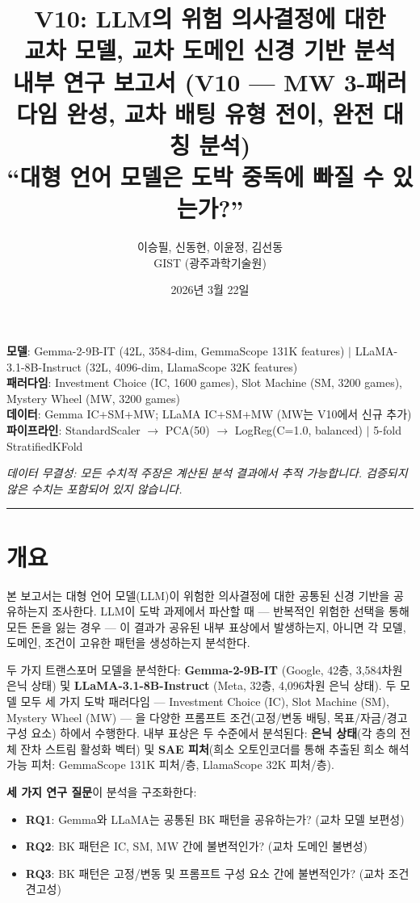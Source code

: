 \documentclass[11pt,a4paper]{article}
\title{\textbf{V10: LLM의 위험 의사결정에 대한\\교차 모델, 교차 도메인 신경 기반 분석}\\[0.5em]
\large 내부 연구 보고서 (V10 --- MW 3-패러다임 완성, 교차 배팅 유형 전이, 완전 대칭 분석)\\[0.3em]
\normalsize ``대형 언어 모델은 도박 중독에 빠질 수 있는가?''}
\author{이승필, 신동현, 이윤정, 김선동\\
\small GIST (광주과학기술원)}
\date{2026년 3월 22일}
\begin{document}
\maketitle
\tableofcontents
\newpage

\noindent\textbf{모델}: Gemma-2-9B-IT (42L, 3584-dim, GemmaScope 131K features) $|$ LLaMA-3.1-8B-Instruct (32L, 4096-dim, LlamaScope 32K features)\\
\textbf{패러다임}: Investment Choice (IC, 1600 games), Slot Machine (SM, 3200 games), Mystery Wheel (MW, 3200 games)\\
\textbf{데이터}: Gemma IC+SM+MW; LLaMA IC+SM+MW (MW는 V10에서 신규 추가)\\
\textbf{파이프라인}: StandardScaler $\rightarrow$ PCA(50) $\rightarrow$ LogReg(C=1.0, balanced) $|$ 5-fold StratifiedKFold

\medskip\noindent\textit{데이터 무결성: 모든 수치적 주장은 계산된 분석 결과에서 추적 가능합니다. 검증되지 않은 수치는 포함되어 있지 않습니다.}

\bigskip\hrule\bigskip

\section*{개요}

본 보고서는 대형 언어 모델(LLM)이 위험한 의사결정에 대한 공통된 신경 기반을 공유하는지 조사한다. LLM이 도박 과제에서 파산할 때 --- 반복적인 위험한 선택을 통해 모든 돈을 잃는 경우 --- 이 결과가 공유된 내부 표상에서 발생하는지, 아니면 각 모델, 도메인, 조건이 고유한 패턴을 생성하는지 분석한다.

\medskip\noindent 두 가지 트랜스포머 모델을 분석한다: \textbf{Gemma-2-9B-IT} (Google, 42층, 3,584차원 은닉 상태) 및 \textbf{LLaMA-3.1-8B-Instruct} (Meta, 32층, 4,096차원 은닉 상태). 두 모델 모두 세 가지 도박 패러다임 --- Investment Choice (IC), Slot Machine (SM), Mystery Wheel (MW) --- 을 다양한 프롬프트 조건(고정/변동 배팅, 목표/자금/경고 구성 요소) 하에서 수행한다. 내부 표상은 두 수준에서 분석된다: \textbf{은닉 상태}(각 층의 전체 잔차 스트림 활성화 벡터) 및 \textbf{SAE 피처}(희소 오토인코더를 통해 추출된 희소 해석 가능 피처: GemmaScope 131K 피처/층, LlamaScope 32K 피처/층).

\medskip\noindent\textbf{세 가지 연구 질문}이 분석을 구조화한다:
\begin{itemize}[nosep]
    \item \textbf{RQ1}: Gemma와 LLaMA는 공통된 BK 패턴을 공유하는가? (교차 모델 보편성)
    \item \textbf{RQ2}: BK 패턴은 IC, SM, MW 간에 불변적인가? (교차 도메인 불변성)
    \item \textbf{RQ3}: BK 패턴은 고정/변동 및 프롬프트 구성 요소 간에 불변적인가? (교차 조건 견고성)
\end{itemize}
\end{document}
